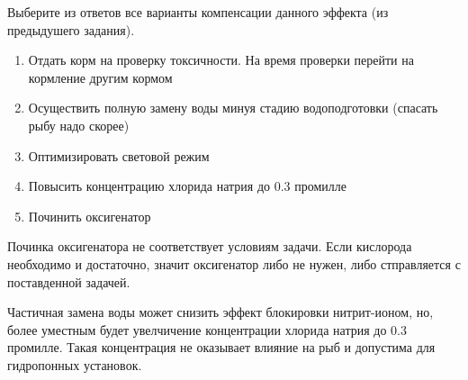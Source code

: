 
Выберите из ответов все варианты компенсации данного эффекта (из предыдушего задания).

\begin{enumerate}
    \item Отдать корм на проверку токсичности. На время проверки перейти на кормление другим кормом
    \item Осуществить полную замену воды минуя стадию водоподготовки (спасать рыбу надо скорее)
    \item Оптимизировать световой режим
    \item Повысить концентрацию хлорида натрия до 0.3 промилле
    \item Починить оксигенатор
\end{enumerate}

\explanationSection

Починка оксигенатора не соответствует условиям задачи. Если кислорода необходимо и достаточно, значит оксигенатор либо не нужен, либо стправляется с поставденной задачей.

Частичная замена воды может снизить эффект блокировки нитрит-ионом, но, более уместным будет увелчичение концентрации хлорида натрия до 0.3 промилле. Такая концентрация не оказывает влияние на рыб и допустима для гидропонных установок.

